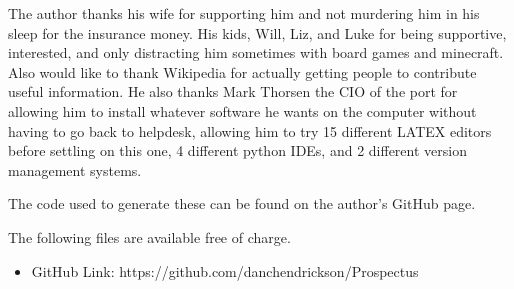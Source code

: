\documentclass[journal=jacsat,manuscript=article]{achemso}
\begin{document}
\pagebreak
\begin{acknowledgement}

The author thanks his wife for supporting him and not murdering him in his sleep for the insurance money.  His kids, Will, Liz, and Luke for being supportive, interested, and only distracting him sometimes with board games and minecraft.  Also would like to thank Wikipedia for actually getting people to contribute useful information.  He also thanks Mark Thorsen the CIO of the port for allowing him to install whatever software he wants on the computer without having to go back to helpdesk, allowing him to try 15 different LATEX editors before settling on this one, 4 different python IDEs, and 2 different version management systems.

\end{acknowledgement}

\begin{suppinfo}

The code used to generate these can be found on the author's GitHub page.

The following files are available free of charge.
\begin{itemize}
  \item GitHub Link: https://github.com/danchendrickson/Prospectus
\end{itemize}

\end{suppinfo}


	

\end{document}
